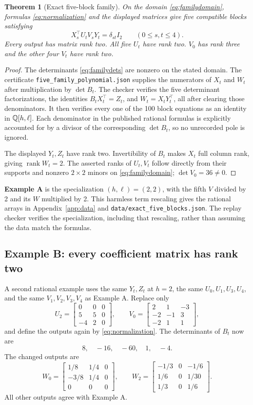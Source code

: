 \documentclass[11pt]{article}
\newtheorem{theorem}{Theorem}[section]
\theoremstyle{definition}\newtheorem{definition}[theorem]{Definition}
\newcommand{\rank}{\operatorname{rank}}
\newcommand{\file}[1]{\nolinkurl{#1}}
\newcommand{\bb}[1]{\begin{bmatrix}#1\end{bmatrix}}
\begin{document}
\begin{theorem}[Exact five-block family]\label{thm:family}
On the domain \eqref{eq:familydomain}, formulas \eqref{eq:normalization} and the displayed matrices give five compatible blocks satisfying
\[
X_s^\top U_tV_sY_t=\delta_{st}I_2\qquad(0\le s,t\le4).
\]
Every output has matrix rank two. All five $U_t$ have rank two. $V_0$ has rank three and the other four $V_t$ have rank two.
\end{theorem}
\begin{proof}
The determinants \eqref{eq:familydets} are nonzero on the stated domain. The certificate \file{five_family_polynomial.json} supplies the numerators of $X_t$ and $W_t$ after multiplication by $\det B_t$. The checker verifies the five determinant factorizations, the identities $B_tX_t^\top=Z_t$, and $W_t=X_tY_t^\top$, all after clearing those denominators. It then verifies every one of the 100 block equations as an identity in $\mathbb Q[h,\ell]$. Each denominator in the published rational formulas is explicitly accounted for by a divisor of the corresponding $\det B_t$, so no unrecorded pole is ignored.

The displayed $Y_t,Z_t$ have rank two. Invertibility of $B_t$ makes $X_t$ full column rank, giving $\rank W_t=2$. The asserted ranks of $U_t,V_t$ follow directly from their supports and nonzero $2\times2$ minors on \eqref{eq:familydomain}; $\det V_0=36\ne0$.
\end{proof}

\textbf{Example A} is the specialization $(h,\ell)=(2,2)$, with the fifth $V$ divided by 2 and its $W$ multiplied by 2. This harmless term rescaling gives the rational arrays in Appendix~\ref{app:data} and \file{data/exact_five_blocks.json}. The replay checker verifies the specialization, including that rescaling, rather than assuming the data match the formulas.

\subsection{Example B: every coefficient matrix has rank two}\label{subsec:B}
A second rational example uses the same $Y_t,Z_t$ at $h=2$, the same $U_0,U_1,U_3,U_4$, and the same $V_1,V_2,V_3,V_4$ as Example A. Replace only
\begin{equation}\label{eq:Bchanges}
U_2=\bb{0&0&0\\5&5&0\\-4&2&0},\qquad
V_0=\bb{2&1&-3\\-2&-1&3\\-2&1&1},
\end{equation}
and define the outputs again by \eqref{eq:normalization}. The determinants of $B_t$ now are
\[
8,\quad-16,\quad-60,\quad1,\quad-4.
\]
The changed outputs are
\[
W_0=\bb{1/8&1/4&0\\-3/8&1/4&0\\0&0&0},\qquad
W_2=\bb{-1/3&0&-1/6\\1/6&0&1/30\\1/3&0&1/6}.
\]
All other outputs agree with Example A.
\end{document}
